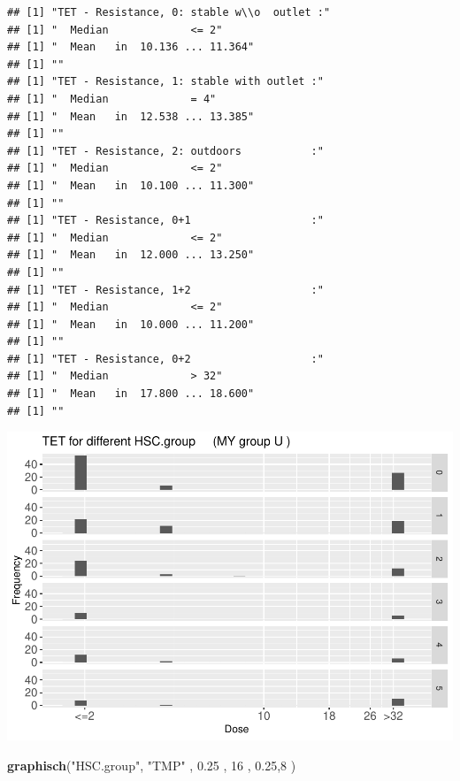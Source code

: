 \documentclass[
]{article}
\newenvironment{Shaded}{\begin{snugshade}}{\end{snugshade}}
\newcommand{\DecValTok}[1]{\textcolor[rgb]{0.00,0.00,0.81}{#1}}
\newcommand{\FloatTok}[1]{\textcolor[rgb]{0.00,0.00,0.81}{#1}}
\newcommand{\KeywordTok}[1]{\textcolor[rgb]{0.13,0.29,0.53}{\textbf{#1}}}
\newcommand{\NormalTok}[1]{#1}
\newcommand{\StringTok}[1]{\textcolor[rgb]{0.31,0.60,0.02}{#1}}
\begin{document}
\begin{verbatim}
## [1] "TET - Resistance, 0: stable w\\o  outlet :"
## [1] "  Median             <= 2"
## [1] "  Mean   in  10.136 ... 11.364"
## [1] ""
## [1] "TET - Resistance, 1: stable with outlet :"
## [1] "  Median             = 4"
## [1] "  Mean   in  12.538 ... 13.385"
## [1] ""
## [1] "TET - Resistance, 2: outdoors           :"
## [1] "  Median             <= 2"
## [1] "  Mean   in  10.100 ... 11.300"
## [1] ""
## [1] "TET - Resistance, 0+1                   :"
## [1] "  Median             <= 2"
## [1] "  Mean   in  12.000 ... 13.250"
## [1] ""
## [1] "TET - Resistance, 1+2                   :"
## [1] "  Median             <= 2"
## [1] "  Mean   in  10.000 ... 11.200"
## [1] ""
## [1] "TET - Resistance, 0+2                   :"
## [1] "  Median             > 32"
## [1] "  Mean   in  17.800 ... 18.600"
## [1] ""
\end{verbatim}

\includegraphics{Verteilungen_files/figure-latex/unnamed-chunk-54-1.pdf}

\begin{Shaded}
\begin{Highlighting}[]
   \KeywordTok{graphisch}\NormalTok{(}\StringTok{"HSC.group"}\NormalTok{, }\StringTok{"TMP"}\NormalTok{ , }\FloatTok{0.25}\NormalTok{ ,  }\DecValTok{16}\NormalTok{   ,   }\FloatTok{0.25}\NormalTok{,}\DecValTok{8}\NormalTok{    ) }
\end{Highlighting}
\end{Shaded}
\end{document}
